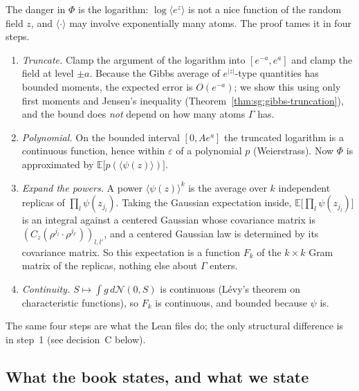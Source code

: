 The danger in $\Phi$ is the logarithm: $\log\langle e^{z}\rangle$ is not a nice function of the random field $z$, and $\langle\cdot\rangle$ may involve exponentially many atoms. The proof tames it in four steps.
\begin{enumerate}
\item \emph{Truncate.} Clamp the argument of the logarithm into $[e^{-a},e^{a}]$ and clamp the field at level $\pm a$. Because the Gibbs average of $e^{|z|}$-type quantities has bounded moments, the expected error is $O(e^{-a})$;
we show this using only first moments and Jensen's inequality (Theorem~\ref{thm:sg:gibbs-truncation}), and the bound does \emph{not} depend on how many atoms $\Gamma$ has.
\item \emph{Polynomial.} On the bounded interval $[0,Ae^{a}]$ the truncated logarithm is a continuous function, hence within $\varepsilon$ of a polynomial $p$ (Weierstrass). Now $\Phi$ is approximated by $\mathbb E\big[p(\langle\psi(z)\rangle)\big]$.
\item \emph{Expand the powers.} A power $\langle\psi(z)\rangle^k$ is the average over $k$ independent replicas of $\prod_l\psi(z_{j_l})$. Taking the Gaussian expectation inside, $\mathbb E\big[\prod_l\psi(z_{j_l})\big]$ is an integral
against a centered Gaussian whose covariance matrix is $(C_z(\rho^{j_l}\cdot\rho^{j_{l'}}))_{l,l'}$, and a centered Gaussian law is determined by its covariance matrix. So this expectation is a function $F_k$ of the
$k\times k$ Gram matrix of the replicas, nothing else about $\Gamma$ enters.
\item \emph{Continuity.} $S\mapsto\int g\,d\mathcal N(0,S)$ is continuous (L\'evy's theorem on characteristic functions), so $F_k$ is continuous, and bounded because $\psi$ is.
\end{enumerate}
The same four steps are what the Lean files do; the only structural difference is in step~1 (see decision~C below).

\subsection*{What the book states, and what we state}

